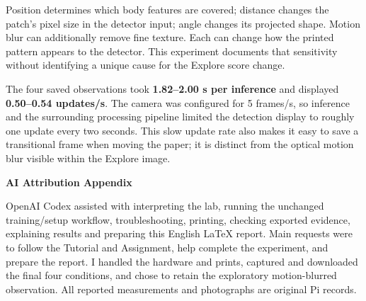 \documentclass[11pt,letterpaper]{article}
\newcommand{\topic}[1]{\par\smallskip\textbf{#1}\par\nopagebreak}
\begin{document}
Position determines which body features are covered; distance changes the patch's pixel size in the detector input; angle changes its projected shape. Motion blur can additionally remove fine texture. Each can change how the printed pattern appears to the detector. This experiment documents that sensitivity without identifying a unique cause for the Explore score change.

The four saved observations took \textbf{1.82--2.00 s per inference} and displayed \textbf{0.50--0.54 updates/s}. The camera was configured for 5 frames/s, so inference and the surrounding processing pipeline limited the detection display to roughly one update every two seconds. This slow update rate also makes it easy to save a transitional frame when moving the paper; it is distinct from the optical motion blur visible within the Explore image.

\topic{AI Attribution Appendix}
{\small OpenAI Codex assisted with interpreting the lab, running the unchanged training/setup workflow, troubleshooting, printing, checking exported evidence, explaining results and preparing this English LaTeX report. Main requests were to follow the Tutorial and Assignment, help complete the experiment, and prepare the report. I handled the hardware and prints, captured and downloaded the final four conditions, and chose to retain the exploratory motion-blurred observation. All reported measurements and photographs are original Pi records.}
\end{document}
